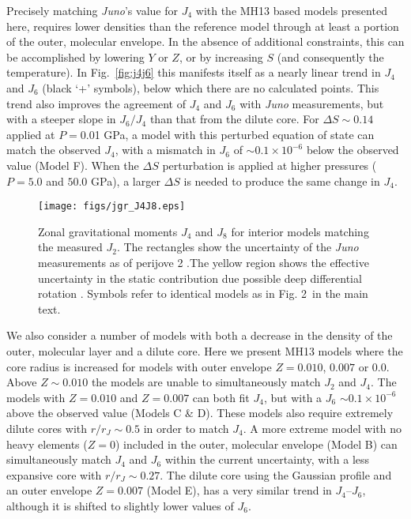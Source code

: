 Precisely matching \textit{Juno}'s value for $J_4$ with the MH13 based models
presented here, requires lower densities than the reference model through at
least a portion of the outer, molecular envelope. In the absence of additional
constraints, this can be accomplished by lowering $Y$ or $Z$, or by increasing
$S$ (and consequently the temperature). In Fig.~\ref{fig:j4j6} this manifests
itself as a nearly linear trend in $J_4$ and $J_6$ (black `+' symbols), below
which there are no calculated points.  This trend also improves the agreement
of $J_4$ and $J_6$ with \textit{Juno} measurements, but with a steeper slope in
$J_6/J_4$ than that from the dilute core.  For $\Delta S\sim0.14$ applied at
$P=$0.01 GPa, a model with this perturbed equation of state can match the
observed $J_4$, with a mismatch in  $J_6$ of $\sim0.1\times10^{-6}$ below the
observed value (Model F).  When the $\Delta S$ perturbation is applied at
higher pressures ($P=5.0$ and $50.0$ GPa), a larger $\Delta S$ is needed to
produce the same change in $J_4$.

\begin{figure}[h]
\centering

\texttt{[image: figs/jgr\_J4J8.eps]}

\caption{ Zonal gravitational moments $J_4$ and $J_8$ for interior models
    matching the measured $J_2$. The rectangles show the uncertainty of the
    \textit{Juno} measurements as of perijove 2 \citep{Folkner2017}.The yellow region
    shows the effective uncertainty in the static contribution due possible deep
    differential rotation \citep{Kaspi2017}. Symbols refer to identical models as in
Fig. 2~in the main text. }
\label{fig:j4j8}
\end{figure}

We also consider a number of models with both a decrease in the density of the outer,
molecular layer and a dilute core. Here we present MH13 models where the core
radius is increased for models with outer envelope $Z=0.010$, $0.007$ or $0.0$.
Above $Z\sim0.010$ the models are unable to simultaneously match $J_2$ and $J_4$. The
models with $Z=0.010$ and $Z=0.007$ can both fit $J_4$, but with a $J_6$ 
$\sim0.1\times 10^{-6}$ above the observed value (Models C \& D). These models also
require extremely dilute cores with $r/r_J\sim0.5$ in order to match $J_4$. A more
extreme model with no heavy elements ($Z=0$) included in the outer, molecular
envelope (Model B) can simultaneously match $J_4$ and $J_6$ within the current
uncertainty, with a less expansive core with $r/r_J\sim0.27$. The dilute
core using the Gaussian profile and an outer envelope $Z=0.007$ (Model E), has a very similar
trend in $J_4$--$J_6$, although it is shifted to slightly lower values of $J_6$.

